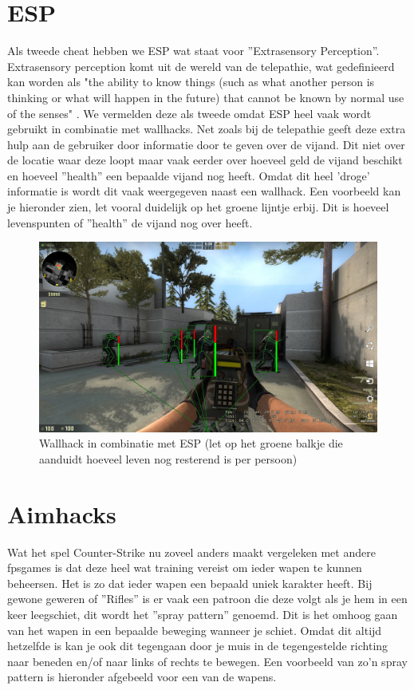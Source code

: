 \documentclass[pdftex,a4paper,12pt,twoside]{report}
\begin{document}
\section{ESP}
\label{ESP}
Als tweede \gls{cheat} hebben we ESP wat staat voor ''Extrasensory Perception''. Extrasensory perception komt uit de wereld van de telepathie, wat gedefinieerd kan worden als "the ability to know things (such as what another person is thinking or what will happen in the future) that cannot be known by normal use of the senses" \citep{extrasensoryperception}. We vermelden deze als tweede omdat ESP heel vaak wordt gebruikt in combinatie met wallhacks. Net zoals bij de telepathie geeft deze extra hulp aan de gebruiker door informatie door te geven over de vijand. Dit niet over de locatie waar deze loopt maar vaak eerder over hoeveel geld de vijand beschikt en hoeveel ''health'' een bepaalde vijand nog heeft.
Omdat dit heel 'droge' informatie is wordt dit vaak weergegeven naast een wallhack. Een voorbeeld kan je hieronder zien, let vooral duidelijk op het groene lijntje erbij. Dit is hoeveel levenspunten of ''health'' de vijand nog over heeft.

\newpage
\begin{figure}[H]
\centering
\includegraphics[width=15cm]{img/esp-example}
\caption{Wallhack in combinatie met ESP (let op het groene balkje die aanduidt hoeveel leven nog resterend is per persoon)}
\end{figure}
  
\section{Aimhacks}
\label{sec:aim}
Wat het spel Counter-Strike nu zoveel anders maakt vergeleken met andere \gls{fpsgames} is dat deze heel wat training vereist om ieder wapen te kunnen beheersen. Het is zo dat ieder wapen een bepaald uniek karakter heeft. Bij gewone geweren of ''Rifles'' is er vaak een patroon die deze volgt als je hem in een keer leegschiet, dit wordt het ''spray pattern'' genoemd. Dit is het omhoog gaan van het wapen in een bepaalde beweging wanneer je schiet. Omdat dit altijd hetzelfde is kan je ook dit tegengaan door je muis in de tegengestelde richting naar beneden en/of naar links of rechts te bewegen. Een voorbeeld van zo'n spray pattern is hieronder afgebeeld voor een van de wapens.
\\  
\end{document}
